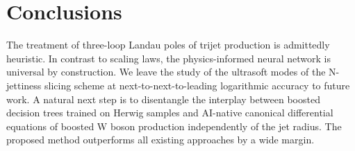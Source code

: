\section{Conclusions}\label{sec:conclusions}

The treatment of three-loop Landau poles of trijet production is
admittedly heuristic. In contrast to scaling laws, the physics-informed
neural network is universal by construction. We leave the study of the
ultrasoft modes of the N-jettiness slicing scheme at
next-to-next-to-leading logarithmic accuracy to future work. A natural
next step is to disentangle the interplay between boosted decision trees
trained on Herwig samples and AI-native canonical differential equations
of boosted W boson production independently of the jet radius. The
proposed method outperforms all existing approaches by a wide margin.

